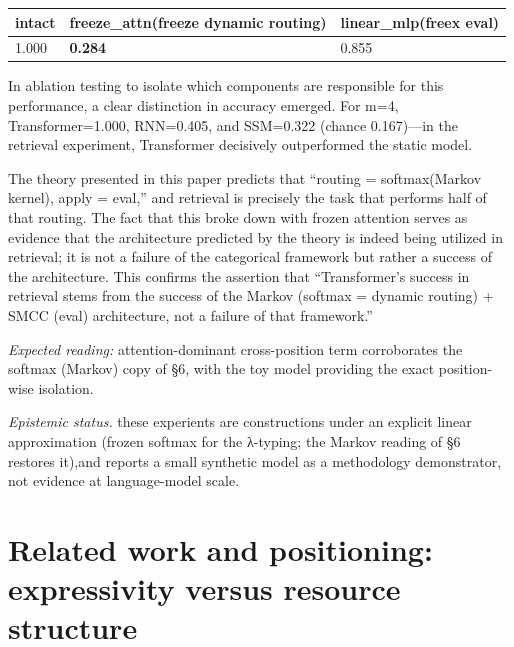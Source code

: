 \documentclass[a4paper,11pt]{article}
\begin{document}
\begin{longtable}[]{@{}lll@{}}
\toprule
intact & freeze\_attn(freeze dynamic routing) & linear\_mlp(freex eval)\tabularnewline
\midrule
\endhead
1.000 & \textbf{0.284} & 0.855\tabularnewline
\bottomrule
\end{longtable}

In ablation testing to isolate which components are responsible for this
performance, a clear distinction in accuracy emerged. For m=4,
Transformer=1.000, RNN=0.405, and SSM=0.322 (chance 0.167)---in the
retrieval experiment, Transformer decisively outperformed the static
model.

The theory presented in this paper predicts that ``routing =
softmax(Markov kernel), apply = eval,'' and retrieval is precisely the
task that performs half of that routing. The fact that this broke down
with frozen attention serves as evidence that the architecture predicted
by the theory is indeed being utilized in retrieval; it is not a failure
of the categorical framework but rather a success of the architecture.
This confirms the assertion that ``Transformer's success in retrieval
stems from the success of the Markov (softmax = dynamic routing) + SMCC
(eval) architecture, not a failure of that framework.''

\emph{Expected reading:} attention-dominant cross-position term corroborates the softmax (Markov) copy of §6, with the toy model providing the exact position-wise isolation.

\emph{Epistemic status.} these experients are constructions under an explicit linear approximation (frozen softmax for the λ-typing; the Markov reading of §6 restores it),and  reports a small synthetic model as a methodology demonstrator, not evidence at language-model scale.

\hypertarget{related-work-and-positioning-expressivity-versus-resource-structure}{%
\section{Related work and positioning: expressivity versus resource
structure}\label{related-work-and-positioning-expressivity-versus-resource-structure}}
\end{document}
